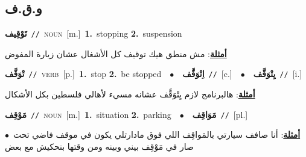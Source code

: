 \documentclass[10pt,a4paper,twoside]{article} %
\begin{document}
\begin{multicols}{2}
\vspace{-3mm}
\subsection*{\color{blue}\foreignlanguage{arabic}{و.ق.ف}\color{blue}{}} 

{\setlength\topsep{0pt}\textbf{\foreignlanguage{arabic}{تَوْقِيف}}\ {\color{gray}\texttt{//}\color{black}}\ \textsc{noun}\ [m.]\ \textbf{1.}~stopping  \textbf{2.}~suspension\  \begin{flushright}\color{gray}\foreignlanguage{arabic}{\textbf{\underline{\foreignlanguage{arabic}{أمثلة}}}: مش منطق هيك توقيف كل الأشغال عشان زيارة المفوض}\end{flushright}\color{black}} \vspace{2mm}

{\setlength\topsep{0pt}\textbf{\foreignlanguage{arabic}{تْوَقَّف}}\ {\color{gray}\texttt{//}\color{black}}\ \textsc{verb}\ [p.]\ \textbf{1.}~stop  \textbf{2.}~be stopped\ \ $\bullet$\ \ \setlength\topsep{0pt}\textbf{\foreignlanguage{arabic}{اِتْوَقَّف}}\ {\color{gray}\texttt{//}\color{black}}\ [c.]\ \ $\bullet$\ \ \setlength\topsep{0pt}\textbf{\foreignlanguage{arabic}{يِتْوَقَّف}}\ {\color{gray}\texttt{//}\color{black}}\ [i.]\  \begin{flushright}\color{gray}\foreignlanguage{arabic}{\textbf{\underline{\foreignlanguage{arabic}{أمثلة}}}: هالبرنامج لازم يِتْوَقَّف عشانه مسيء لأهالي فلسطين بكل الأشكال}\end{flushright}\color{black}} \vspace{2mm}

{\setlength\topsep{0pt}\textbf{\foreignlanguage{arabic}{مَوْقِف}}\ {\color{gray}\texttt{//}\color{black}}\ \textsc{noun}\ [m.]\ \textbf{1.}~situation  \textbf{2.}~parking\ \ $\bullet$\ \ \setlength\topsep{0pt}\textbf{\foreignlanguage{arabic}{مَوَاقِف}}\ {\color{gray}\texttt{//}\color{black}}\ [pl.]\  \begin{flushright}\color{gray}\foreignlanguage{arabic}{\textbf{\underline{\foreignlanguage{arabic}{أمثلة}}}: أنا صافف سيارتي بالمَواقِف اللي فوق مادارتلي يكون في موقف فاضي تحت\ $\bullet$\ \  صار في مَوْقِف بيني وبينه ومن وقتها بنحكيش مع بعض}\end{flushright}\color{black}} \vspace{2mm}


\end{multicols}
\end{document}
